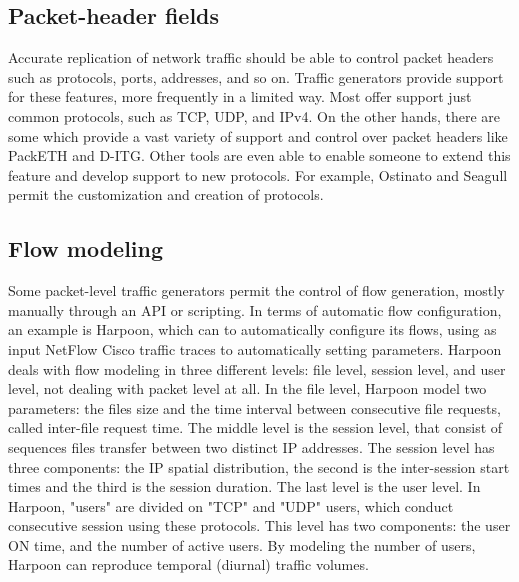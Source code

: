 \subsection{Packet-header fields}

Accurate replication of network traffic should be able to control packet headers such as protocols, ports, addresses, and so on. Traffic generators provide support for these features, more frequently in a limited way. Most offer support just common protocols, such as TCP, UDP, and \acrshort{IPv4}. On the other hands, there are some which provide a vast variety of support and control over packet headers like PackETH\cite{web-packeth} and D-ITG\cite{web-ditg}. Other tools are even able to enable someone to extend this feature and develop support to new protocols. For example, Ostinato and Seagull permit the customization and creation of protocols\cite{wp-seagull}.


\subsection{Flow modeling}

Some packet-level traffic generators permit the control of flow generation, mostly manually through an API or scripting. In terms of automatic flow configuration, an example is Harpoon\cite{harpoon-paper}, which can to automatically configure its flows, using as input NetFlow Cisco traffic traces to automatically setting parameters. Harpoon deals with flow modeling in three different levels: file level, session level, and user level, not dealing with packet level at all. In the file level, Harpoon model two parameters: the files size and the time interval between consecutive file requests, called inter-file request time. The middle level is the session level, that consist of sequences files transfer between two distinct \acrshort{IP} addresses. The session level has three components: the IP spatial distribution, the second is the inter-session start times and the third is the session duration. The last level is the user level. In Harpoon, "users" are divided on "TCP" and "UDP" users, which conduct consecutive session using these protocols. This level has two components: the user ON time, and the number of active users. By modeling the number of users, Harpoon can reproduce temporal (diurnal) traffic volumes.



